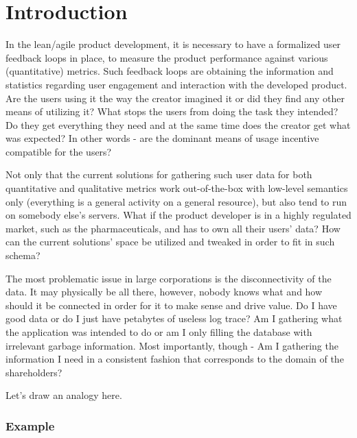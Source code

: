 \chapter{Introduction}

In the lean/agile product development, it is necessary to have a formalized user feedback loops in place, to measure the product performance against various (quantitative) metrics. Such feedback loops are obtaining the information and statistics regarding user engagement and interaction with the developed product. Are the users using it the way the creator imagined it or did they find any other means of utilizing it? What stops the users from doing the task they intended? Do they get everything they need and at the same time does the creator get what was expected? In other words - are the dominant means of usage incentive compatible for the users? 

Not only that the current solutions for gathering such user data for both quantitative and qualitative metrics work out-of-the-box with low-level semantics only (everything is a general activity on a general resource), but also tend to run on somebody else's servers. What if the product developer is in a highly regulated market, such as the pharmaceuticals, and has to own all their users' data? How can the current solutions' space be utilized and tweaked in order to fit in such schema?

The most problematic issue in large corporations is the disconnectivity of the data. It may physically be all there, however, nobody knows what and how should it be connected in order for it to make sense and drive value. Do I have good data or do I just have petabytes of useless log trace? Am I gathering what the application was intended to do or am I only filling the database with irrelevant garbage information. Most importantly, though - Am I gathering the information I need in a consistent fashion that corresponds to the domain of the shareholders?

Let's draw an analogy here.

\subsection*{Example}

